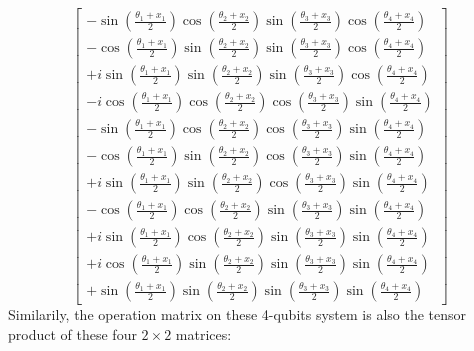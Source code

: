 \documentclass[12pt]{article}
\numberwithin{equation}{section}  %
\theoremstyle{definition}
\theoremstyle{plain}
\theoremstyle{remark}
\begin{document}
\begin{equation}
\begin{bmatrix}
-\sin\left(\frac{\theta_1+x_1}{2}\right)
\cos\left(\frac{\theta_2+x_2}{2}\right)
\sin\left(\frac{\theta_3+x_3}{2}\right)
\cos\left(\frac{\theta_4+x_4}{2}\right)
\\[6pt]
-\cos\left(\frac{\theta_1+x_1}{2}\right)
\sin\left(\frac{\theta_2+x_2}{2}\right)
\sin\left(\frac{\theta_3+x_3}{2}\right)
\cos\left(\frac{\theta_4+x_4}{2}\right)
\\[6pt]
+i\sin\left(\frac{\theta_1+x_1}{2}\right)
\sin\left(\frac{\theta_2+x_2}{2}\right)
\sin\left(\frac{\theta_3+x_3}{2}\right)
\cos\left(\frac{\theta_4+x_4}{2}\right)
\\[6pt]
-i\cos\left(\frac{\theta_1+x_1}{2}\right)
\cos\left(\frac{\theta_2+x_2}{2}\right)
\cos\left(\frac{\theta_3+x_3}{2}\right)
\sin\left(\frac{\theta_4+x_4}{2}\right)
\\[6pt]
-\sin\left(\frac{\theta_1+x_1}{2}\right)
\cos\left(\frac{\theta_2+x_2}{2}\right)
\cos\left(\frac{\theta_3+x_3}{2}\right)
\sin\left(\frac{\theta_4+x_4}{2}\right)
\\[6pt]
-\cos\left(\frac{\theta_1+x_1}{2}\right)
\sin\left(\frac{\theta_2+x_2}{2}\right)
\cos\left(\frac{\theta_3+x_3}{2}\right)
\sin\left(\frac{\theta_4+x_4}{2}\right)
\\[6pt]
+i\sin\left(\frac{\theta_1+x_1}{2}\right)
\sin\left(\frac{\theta_2+x_2}{2}\right)
\cos\left(\frac{\theta_3+x_3}{2}\right)
\sin\left(\frac{\theta_4+x_4}{2}\right)
\\[6pt]
-\cos\left(\frac{\theta_1+x_1}{2}\right)
\cos\left(\frac{\theta_2+x_2}{2}\right)
\sin\left(\frac{\theta_3+x_3}{2}\right)
\sin\left(\frac{\theta_4+x_4}{2}\right)
\\[6pt]
+i\sin\left(\frac{\theta_1+x_1}{2}\right)
\cos\left(\frac{\theta_2+x_2}{2}\right)
\sin\left(\frac{\theta_3+x_3}{2}\right)
\sin\left(\frac{\theta_4+x_4}{2}\right)
\\[6pt]
+i\cos\left(\frac{\theta_1+x_1}{2}\right)
\sin\left(\frac{\theta_2+x_2}{2}\right)
\sin\left(\frac{\theta_3+x_3}{2}\right)
\sin\left(\frac{\theta_4+x_4}{2}\right)
\\[6pt]
+\sin\left(\frac{\theta_1+x_1}{2}\right)
\sin\left(\frac{\theta_2+x_2}{2}\right)
\sin\left(\frac{\theta_3+x_3}{2}\right)
\sin\left(\frac{\theta_4+x_4}{2}\right)
\end{bmatrix}
\label{4state}
\end{equation}
Similarily, the operation matrix on these 4-qubits system is also the tensor product of these four $2\times2$ matrices:
\end{document}
